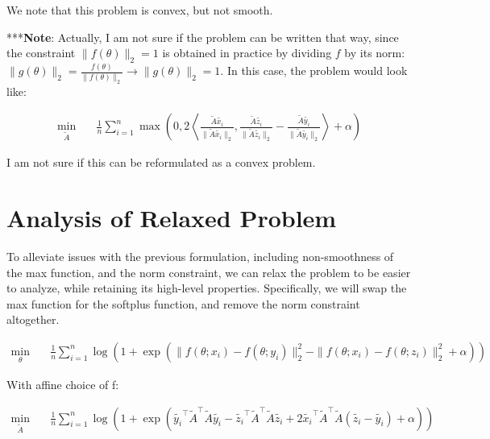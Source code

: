 \documentclass[11pt]{article}
\begin{document}
We note that this problem is convex, but not smooth.

\bigskip

***\textbf{Note}: Actually, I am not sure if the problem can be written that way, since the constraint $\| f(\theta)\|_2 = 1$ is obtained in practice by dividing $f$ by its norm: $\| g(\theta)\|_2 = \frac{f(\theta)}{\| f(\theta)\|_2} \rightarrow \| g(\theta)\|_2 = 1$. In this case, the problem would look like:

\begin{equation}
\begin{aligned}
    \min_{\tilde{A}} \quad & \frac{1}{n} \sum_{i=1}^{n} \max\left(0, 2\left\langle \frac{\tilde{A} \tilde{x_i}}{\| \tilde{A} \tilde{x_i} \|_2}, \frac{\tilde{A} \tilde{z_i}}{\| \tilde{A} \tilde{z_i} \|_2} - \frac{\tilde{A} \tilde{y_i}}{\| \tilde{A} \tilde{y_i} \|_2} \right\rangle + \alpha\right)
\end{aligned}
\end{equation}

I am not sure if this can be reformulated as a convex problem.

\section{Analysis of Relaxed Problem}

To alleviate issues with the previous formulation, including non-smoothness of the max function, and the norm constraint, we can relax the problem to be easier to analyze, while retaining its high-level properties. Specifically, we will swap the max function for the softplus function, and remove the norm constraint altogether.

\begin{equation}
\begin{aligned}
    \min_{\theta} \quad & \frac{1}{n} \sum_{i=1}^{n} \log{(1 + \exp{( \| f(\theta; x_i) - f(\theta; y_i)\|_2^2 - \| f(\theta; x_i) - f(\theta; z_i)\|_2^2 + \alpha)})}
\end{aligned}
\end{equation}

With affine choice of f:

\begin{equation}
\label{eq:smooth_problem}
\begin{aligned}
    \min_{\tilde{A}} \quad & \frac{1}{n} \sum_{i=1}^{n} \log{(1 + \exp{(\tilde{y_i}^\top\tilde{A}^\top\tilde{A}\tilde{y_i} - \tilde{z_i}^\top\tilde{A}^\top\tilde{A}\tilde{z_i} + 2\tilde{x_i}^\top\tilde{A}^\top\tilde{A}(\tilde{z_i} - \tilde{y_i}) + \alpha)})}
\end{aligned}
\end{equation}
\end{document}

